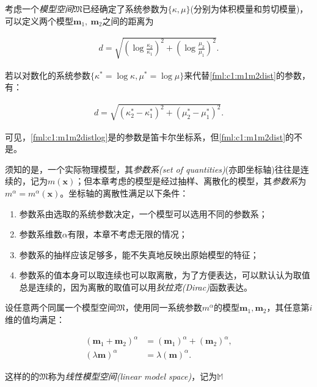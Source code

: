 \begin{example} \label{exp:c1:dist}
  考虑一个\emph{模型空间}$\mathfrak{M}$已经确定了系统参数为$\{\kappa, \mu\}$(分别为体积模量和剪切模量)，可以定义两个模型$\mathbf{m}_1,~\mathbf{m}_2$之间的距离为
  
  \begin{align} \label{fml:c1:m1m2dist}
    d = \sqrt{{\left(\log \frac{\kappa_2}{\kappa_1}\right)}^2+{\left(\log \frac{\mu_2}{\mu_1}\right)}^2}.
  \end{align}
  
  若以对数化的系统参数$\{\kappa^{\ast}=\log \kappa, \mu^{\ast}=\log \mu\}$来代替\eqref{fml:c1:m1m2dist}的参数，有：
  
  \begin{align} \label{fml:c1:m1m2distlog}
    d = \sqrt{{\left(\kappa^{\ast}_2 - \kappa^{\ast}_1\right)}^2+{\left(\mu^{\ast}_2 - \mu^{\ast}_1\right)}^2}.
  \end{align}
  
  可见，\eqref{fml:c1:m1m2distlog}是的参数是笛卡尔坐标系，但\eqref{fml:c1:m1m2dist}的不是。
\end{example}

\begin{character}[离散性] \label{cha:c1:modeldiscre}

须知的是，一个实际物理模型，其\emph{参数系(set of quantities)}(亦即坐标轴)往往是连续的，记为$m(\mathbf{x})$；但本章考虑的模型是经过抽样、离散化的模型，其\emph{参数系}为$m^{\alpha}=m^{\alpha}(\mathbf{x})$。坐标轴的离散性满足以下条件：

\begin{enumerate}
  \item 参数系由选取的系统参数决定，一个模型可以选用不同的参数系；
  \item 参数系维数$\alpha$有限，本章不考虑无限的情况；
  \item 参数系的抽样应该足够多，能不失真地反映出原始模型的特征；
  \item 参数系的值本身可以取连续也可以取离散，为了方便表达，可以默认认为取值总是连续的，因为离散的取值可以用\emph{狄拉克(Dirac)}函数表达。
\end{enumerate}

\end{character}

\begin{character}[线性] \label{cha:c1:modellin}
  
  设任意两个同属一个模型空间$\mathfrak{M}$，使用同一系统参数$m^{\alpha}$的模型$\mathbf{m}_1,\mathbf{m}_2$，其任意第$i$维的值均满足：
  
  \begin{align} 
    (\mathbf{m}_1+\mathbf{m}_2)^{\alpha} &= (\mathbf{m}_1)^{\alpha} + (\mathbf{m}_2)^{\alpha}, \label{fml:c1:modellinearity1} \\
    (\lambda \mathbf{m})^{\alpha} &= \lambda(\mathbf{m})^{\alpha}.\label{fml:c1:modellinearity2}
  \end{align}
  
  这样的的$\mathfrak{M}$称为\emph{线性模型空间(linear model space)}，记为$\mathbb{M}$
  
\end{character}

